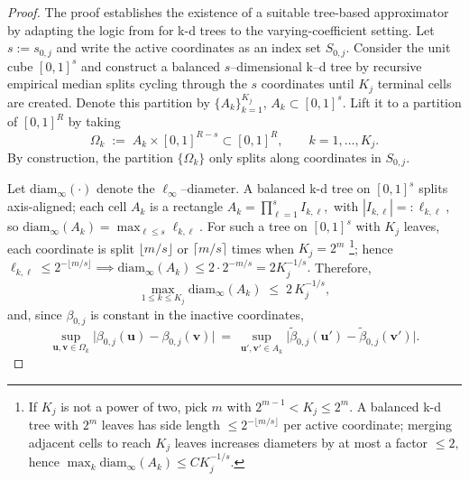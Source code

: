 \documentclass[11pt]{article}
\theoremstyle{plain}
\theoremstyle{definition}
\theoremstyle{plain}
\begin{document}
\begin{proof}
The proof establishes the existence of a suitable tree-based approximator by adapting the logic from \citet[Lemma 3.2]{Rockova2019} for k-d trees to the varying-coefficient setting. 
Let $s:=s_{0,j}$ and write the active coordinates as an index set $S_{0,j}$.
Consider the unit cube $[0,1]^s$ and construct a balanced $s$–dimensional k–d tree
by recursive empirical median splits cycling through the $s$ coordinates until $K_j$ terminal
cells are created. Denote this partition by $\{A_k\}_{k=1}^{K_j}$, $A_k\subset[0,1]^s$.
Lift it to a partition of $[0,1]^R$ by taking
\[
\Omega_k \;:=\; A_k \times [0,1]^{R-s}\subset[0,1]^R,
\qquad k=1,\dots,K_j.
\]
By construction, the partition $\{\Omega_k\}$ only splits along coordinates in $S_{0,j}$.

Let $\mathrm{diam}_\infty(\cdot)$ denote the $\ell_\infty$–diameter. A balanced k-d tree on $[0,1]^s$ splits axis-aligned; each cell $A_k$ is a rectangle $A_k = \prod_{\ell=1}^{s} I_{k,\ell},$ with $|I_{k,\ell}| =: \ell_{k,\ell}$, so $\text{diam}_{\infty}(A_k) = \max_{\ell \le s} \ell_{k,\ell}$.
For such a tree on $[0,1]^s$ with $K_j$ leaves, each coordinate is split
$\lfloor m/s\rfloor$ or $\lceil m/s\rceil$ times when $K_j=2^m$ \footnote{If $K_j$ is not a power of two, pick $m$ with $2^{m-1} < K_j \le 2^m.$ A balanced k-d tree with $2^m$ leaves has side length $\le 2^{-\lfloor m/s \rfloor}$ per active coordinate; merging adjacent cells to reach $K_j$ leaves increases diameters by at most a factor $\le 2,$ hence $\max_{k} \text{diam}_{\infty} (A_k) \le C K_j^{-1/s}.$};
hence $\ell_{k,\ell} \le 2^{-\lfloor m/s\rfloor} \implies \text{diam}_{\infty}(A_k) \le 2 \cdot 2^{-m/s} = 2K_j^{-1/s}.$
Therefore,
\begin{equation}\label{eq:intrinsic-diam}
\max_{1\le k\le K_j}\mathrm{diam}_\infty(A_k)
\;\le\; 2\,K_j^{-1/s},
\end{equation}
and, since $\beta_{0,j}$ is constant in the inactive coordinates,
\begin{equation}\label{eq:intrinsic-diam-extended}
\sup_{\bm{u},\bm{v}\in \Omega_k}\big|\beta_{0,j}(\bm{u})-\beta_{0,j}(\bm{v})\big|
~=~\sup_{\bm{u'},\bm{v'}\in A_k}\big|\tilde\beta_{0,j}(\bm{u'})-\tilde\beta_{0,j}(\bm{v'})\big| .
\end{equation}


\end{proof}
\end{document}
